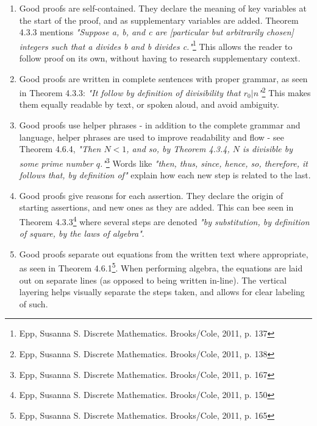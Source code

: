 \documentclass{article}
\begin{document}
\begin{enumerate}
        \item Good proofs are self-contained. They declare the meaning of key variables at the start of the proof, and as supplementary variables are added. Theorem 4.3.3 mentions \emph{"Suppose a, b, and c are [particular but arbitrarily chosen] integers such that a divides b and b divides c."}\footnote{ Epp, Susanna S. Discrete Mathematics. Brooks/Cole, 2011, p. 137} This allows the reader to follow proof on its own, without having to research supplementary context.
        \item Good proofs are written in complete sentences with proper grammar, as seen in Theorem 4.3.3: \emph{"It follow by definition of divisibility that $r_0 | n$"}\footnote{ Epp, Susanna S. Discrete Mathematics. Brooks/Cole, 2011, p. 138} This makes them equally readable by text, or spoken aloud, and avoid ambiguity.
        \item Good proofs use helper phrases - in addition to the complete grammar and language, helper phrases are used to improve readability and flow - see Theorem 4.6.4, \emph{"Then $N < 1$, and so, by Theorem 4.3.4, $N$ is divisible by some prime number $q$."}\footnote{ Epp, Susanna S. Discrete Mathematics. Brooks/Cole, 2011, p. 167} Words like \emph{"then, thus, since, hence, so, therefore, it follows that, by definition of"} explain how each new step is related to the last.
        \item Good proofs give reasons for each assertion. They declare the origin of starting assertions, and new ones as they are added. This can bee seen in Theorem 4.3.3\footnote{ Epp, Susanna S. Discrete Mathematics. Brooks/Cole, 2011, p. 150} where several steps are denoted \emph{"by substitution, by definition of square, by the laws of algebra"}.
        \item Good proofs separate out equations from the written text where appropriate, as seen in Theorem 4.6.1\footnote{ Epp, Susanna S. Discrete Mathematics. Brooks/Cole, 2011, p. 165}. When performing algebra, the equations are laid out on separate lines (as opposed to being written in-line). The vertical layering helps visually separate the steps taken, and allows for clear labeling of such.
\end{enumerate}



\collab{} 
\end{document}
